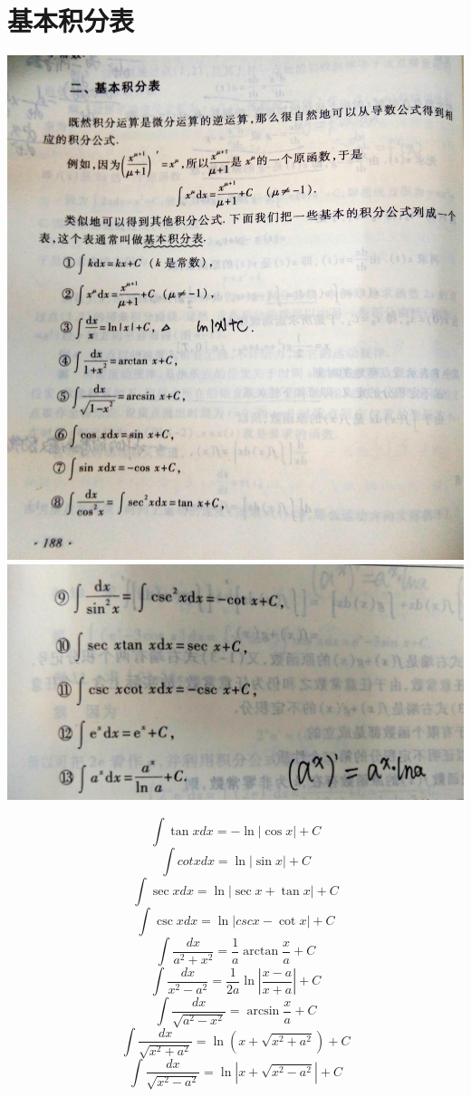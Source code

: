 \documentclass[UTF8]{ctexart}
\begin{document}
\section{基本积分表}
\includegraphics[width=14cm]{9345E7/9476215E0863B8FB681EC9D2BB921BDB.jpg}
\includegraphics[width=14cm]{9345E7/4FEE9C843E57935F87D1E16F255FA43E.jpg}

$$ \int \tan x dx = - \ln |\cos x | +C$$
$$ \int cot x dx = \ln|\sin x| +C$$
$$ \int \sec x dx = \ln |\sec x+ \tan x| +C$$
$$ \int \csc x dx = \ln|csc x-\cot x | +C $$
$$ \int \frac{dx}{a^2+x^2}=\frac{1}{a} \arctan \frac{x}{a} +C $$
$$ \int \frac{dx}{x^2-a^2}=\frac{1}{2a} \ln \left| \frac{x-a}{x+a} \right| +C$$
$$ \int \frac{dx}{\sqrt{a^2-x^2}}=\arcsin \frac{x}{a}+C$$
$$ \int \frac {dx}{\sqrt{x^2+a^2}}=\ln {(x+ \sqrt{x^2+a^2})}+C$$
$$ \int \frac{dx}{\sqrt{x^2-a^2}}= \ln | x+\sqrt{x^2-a^2}|+C$$
\end{document}
